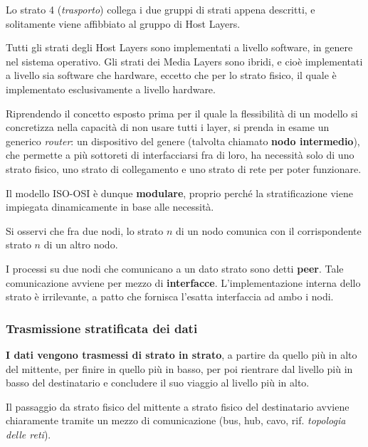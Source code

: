         Lo strato 4 (\textit{trasporto}) collega i due gruppi di strati appena descritti, e solitamente viene affibbiato al gruppo di Host Layers.
        
        \vspace{3mm}
        
        Tutti gli strati degli Host Layers sono implementati a livello software, in genere nel sistema operativo. Gli strati dei Media Layers sono ibridi, e cioè implementati a livello sia software che hardware, eccetto che per lo strato fisico, il quale è implementato esclusivamente a livello hardware.
        
        Riprendendo il concetto esposto prima per il quale la flessibilità di un modello si concretizza nella capacità di non usare tutti i layer, si prenda in esame un generico \textit{router}: un dispositivo del genere (talvolta chiamato \textbf{nodo intermedio}), che permette a più sottoreti di interfacciarsi fra di loro, ha necessità solo di uno strato fisico, uno strato di collegamento e uno strato di rete per poter funzionare.
        
        Il modello ISO-OSI è dunque \textbf{modulare}, proprio perché la stratificazione viene impiegata dinamicamente in base alle necessità.
        
        Si osservi che fra due nodi, lo strato \(n\) di un nodo comunica con il corrispondente strato \(n\) di un altro nodo. 
        
        I processi su due nodi che comunicano a un dato strato sono detti \textbf{peer}. Tale comunicazione avviene per mezzo di \textbf{interfacce}. L'implementazione interna dello strato è irrilevante, a patto che fornisca l'esatta interfaccia ad ambo i nodi.
    
    \subsubsection{Trasmissione stratificata dei dati}
    
        \textbf{I dati vengono trasmessi di strato in strato}, a partire da quello più in alto del mittente, per finire in quello più in basso, per poi rientrare dal livello più in basso del destinatario e concludere il suo viaggio al livello più in alto.
        
        \vspace{3mm}
        
        Il passaggio da strato fisico del mittente a strato fisico del destinatario avviene chiaramente tramite un mezzo di comunicazione (bus, hub, cavo, rif. \textit{topologia delle reti}).
        
